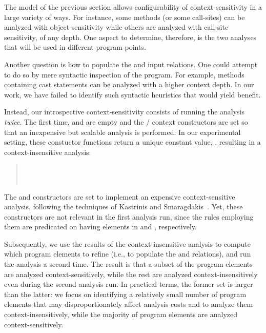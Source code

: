 The model of the previous section allows configurability of
context-sensitivity in a large variety of ways. For instance, some
methods (or some call-sites) can be analyzed with object-sensitivity
while others are analyzed with call-site sensitivity, of any
depth. One aspect to determine, therefore, is the two analyses that
will be used in different program points.

Another question is how to populate the  and
 input relations.  One could attempt to do so
by mere syntactic inspection of the program.  For example, methods
containing cast statements can be analyzed with a higher context
depth. In our work, we have failed to identify such syntactic
heuristics that would yield benefit.

Instead, our introspective context-sensitivity consists of running the
analysis \emph{twice}. The first time,  and
 are empty and the
/ context constructors are set so
that an inexpensive but scalable analysis is performed. In our
experimental setting, these constuctor functions return a unique
constant value, \args{$\star$}, resulting in a context-insensitive
analysis:
\begin{quote}
\\
 \\
\end{quote}

The  and  constructors
are set to implement an expensive context-sensitive analysis,
following the techniques of Kastrinis and
Smaragdakis~\cite{hybrid-pldi13}.  Yet, these constructors are not
relevant in the first analysis run, since the rules employing them are
predicated on having elements in  and
, respectively.

Subsequently, we use the results of the context-insensitive analysis
to compute which program elements to refine (i.e., to populate the
 and  relations), and
run the analysis a second time. The result is that a subset of the
program elements are analyzed context-sensitively, while the rest are
analyzed context-insensitively even during the second analysis run.
In practical terms, the former set is larger than the latter: we focus
on identifying a relatively small number of program elements that may
disproportionately affect analysis costs and to analyze them
context-insensitively, while the majority of program elements are
analyzed context-sensitively.

